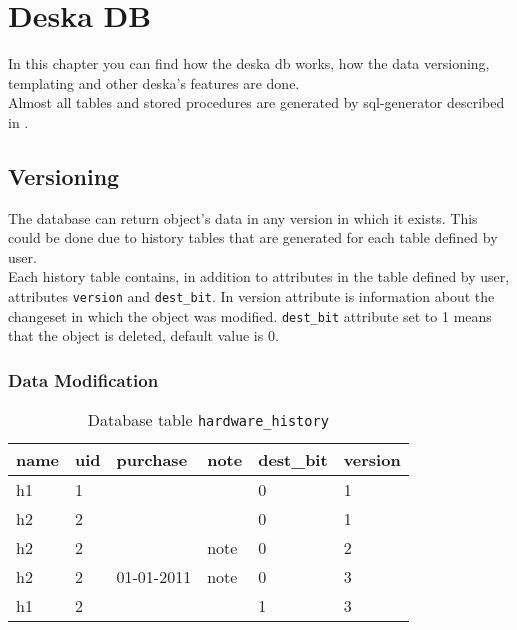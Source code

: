\documentclass[deska]{subfiles}
\begin{document}
\chapter{Deska DB}
\label{sec:deska-db}

\begin{abstract}
\end{abstract}

In this chapter you can find how the deska db works, how the data versioning, templating and other deska's features are done.\\
Almost all tables and stored procedures are generated by sql-generator described in .

\section{Versioning}
\label{sec:versioning}

The database can return object's data in any version in which it exists. This could be done due to history tables that are generated for each table defined by user.\\
Each history table contains, in addition to attributes in the table defined by user, attributes {\tt version} and {\tt dest\_bit}. In version attribute is information about the changeset in which the object was modified. {\tt dest\_bit} attribute set to 1 means that the object is deleted, default value is 0.\\

\subsection{Data Modification}

\begin{longtable}{ l | l | l | l | l | l }
    \caption{Database table {\tt hardware\_history}}
    \label{tab:example-hardwarehist} \\
    name & uid & purchase & note & dest\_bit & version\\
    \hline
    \endhead
    h1 & 1 & & & 0 & 1 \\
    h2 & 2 & & & 0 & 1 \\
    h2 & 2 & & note & 0 & 2 \\
    h2 & 2 & 01-01-2011 & note & 0 & 3 \\
    h1 & 2 & & & 1 & 3 \\
    \hline
\end{longtable}
\end{document}
